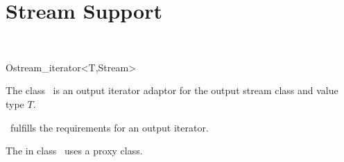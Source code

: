 
\beforecprogskip\medskipamount
\aftercprogskip\medskipamount
\ccParDims

\chapter{Stream Support}
\label{chapterStreamSupport}
\\

\begin{ccClassTemplate}{Ostream_iterator<T,Stream>}

\ccDefinition

The class \ccClassTemplateName\ is an output iterator adaptor for the
output stream class  and value type $T$.


\ccCreation
{}


\ccOperations

\ccVar\ fulfills the requirements for an output iterator.

\ccImplementation

The  in class \ccClassTemplateName\ uses a proxy class. 

\end{ccClassTemplate}

\newpage
 
